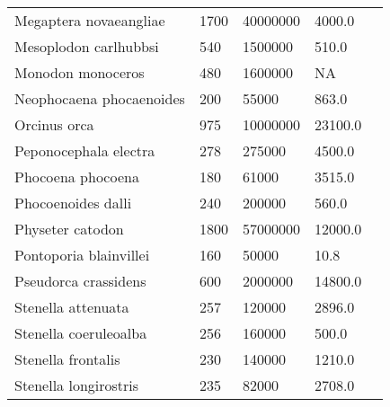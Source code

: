\begin{longtable}{|p{2.1in}p{0.5in}p{1.0in}p{1.0in}p{1.5in}|}
      Megaptera novaeangliae  &         1700 &    40000000  &       4000.0   &                                \citet{jefferson2008} \\
       Mesoplodon carlhubbsi  &          540 &     1500000  &        510.0   &                       \citet{jefferson2008,mead1982} \\
           Monodon monoceros  &          480 &     1600000  &           NA   &                                \citet{jefferson2008} \\
    Neophocaena phocaenoides  &          200 &       55000  &        863.0   &                                   \citet{kasuya1999} \\
                Orcinus orca  &          975 &    10000000  &      23100.0   &                       \citet{jefferson2008,ross1979} \\
       Peponocephala electra  &          278 &      275000  &       4500.0   &                                \citet{jefferson2008} \\
           Phocoena phocoena  &          180 &       61000  &       3515.0   &                                     \citet{read1999} \\
          Phocoenoides dalli  &          240 &      200000  &        560.0   &                                \citet{jefferson2008} \\
            Physeter catodon  &         1800 &    57000000  &      12000.0   &                                \citet{jefferson2008} \\
      Pontoporia blainvillei  &          160 &       50000  &         10.8   &                                \citet{jefferson2008} \\
        Pseudorca crassidens  &          600 &     2000000  &      14800.0   &                                \citet{jefferson2008} \\
          Stenella attenuata  &          257 &      120000  &       2896.0   &                       \citet{jefferson2008,hohn1985} \\
       Stenella coeruleoalba  &          256 &      160000  &        500.0   &                                 \citet{miyazaki1977} \\
          Stenella frontalis  &          230 &      140000  &       1210.0   &                                   \citet{perrin1994} \\
       Stenella longirostris  &          235 &       82000  &       2708.0   &                                \citet{jefferson2008} \\

\end{longtable}

